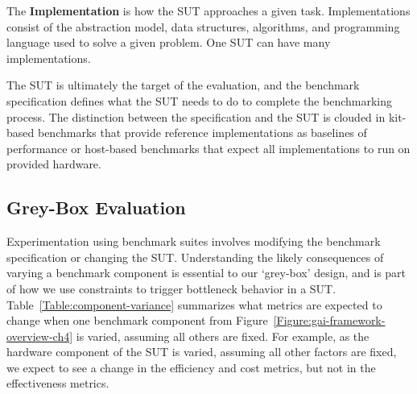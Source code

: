 The \textbf{Implementation}
is how the \ac{SUT} approaches a given task.
Implementations consist of the abstraction model, data structures, algorithms, and programming language used to solve a given \gai problem.
One \ac{SUT} can have many implementations.

The \ac{SUT} is ultimately the target of the evaluation, and the benchmark specification defines what the \ac{SUT} needs to do to complete the benchmarking process. 
The distinction between the specification and the \ac{SUT} is clouded in kit-based benchmarks that provide reference implementations as baselines of performance or host-based benchmarks that expect all implementations to run on provided hardware.

\subsection{Grey-Box Evaluation}


Experimentation using benchmark suites involves modifying the benchmark specification or changing the \ac{SUT}.
Understanding the likely consequences of varying a benchmark component is essential to our `grey-box' design, and is part of how we use constraints to trigger bottleneck behavior in a \ac{SUT}.
Table~\ref{Table:component-variance} summarizes what metrics are expected to change when one benchmark component from Figure~\ref{Figure:gai-framework-overview-ch4} is varied, assuming all others are fixed. 
For example, as the hardware component of the \ac{SUT} is varied, assuming all other factors are fixed, we expect to see a change in the efficiency and cost metrics, but not in the effectiveness metrics. 


